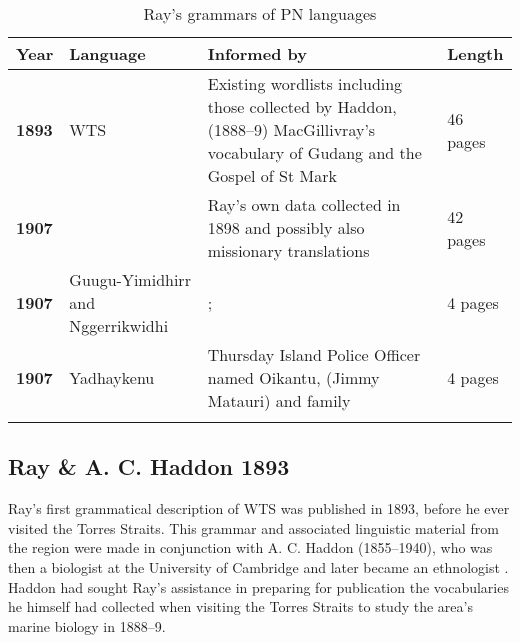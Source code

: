\begin{table}
\begin{tabularx}{\textwidth}{lp{3cm}Ql}
\lsptoprule
 \textbf{Year}
 & \textbf{Language}
 & \textbf{Informed by}
 & \textbf{Length}\\
 \midrule
\textbf{1893}
 & WTS & Existing wordlists including those collected by Haddon, (1888--9) MacGillivray’s vocabulary of Gudang \citeyearpar{gordon_remarks_1852} and the Gospel of St Mark \citep{scott_evangelia_1879}
 & 46 pages\\
\textbf{1907}
 &  & Ray’s own data collected in 1898 and possibly also missionary translations & 42 pages\\
\textbf{1907}
 & Guugu-Yimidhirr and Nggerrikwidhi & \citet{roth_structure_1901}; \citet{hey_elementary_1903}
 & 4 pages\\
\textbf{1907}
 & Yadhaykenu & Thursday Island Police Officer named Oikantu, (Jimmy Matauri) and family & 4 pages\\
\lspbottomrule
\end{tabularx}
\caption{Ray’s grammars of PN languages}
\label{bkm:Ref323815775}
\label{fig:key:214}
\end{table}

\subsection{Ray \& A. C. Haddon 1893}
\label{sec:key:10.2.1}\label{bkm:Ref514608187}

Ray’s first grammatical description of WTS was published in 1893, before he ever visited the Torres Straits. This grammar and associated linguistic material from the region were made in conjunction with A. C. Haddon (1855--1940), who was then a biologist at the University of Cambridge and later became an ethnologist \citep{Mullens1996}. Haddon had sought Ray’s assistance in preparing for publication the vocabularies he himself had collected when visiting the Torres Straits to study the area’s marine biology in 1888--9.

